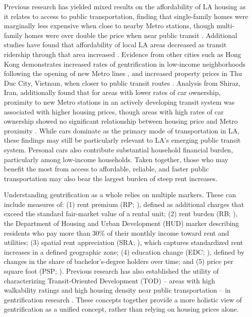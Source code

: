 \documentclass[11pt]{article}
\begin{document}
Previous research has yielded mixed results on the affordability of LA housing as it relates to access to public transportation, finding that single-family homes were marginally less expensive when close to nearby Metro stations, though multi-family homes were over double the price when near public transit \citep{zhong2016rail}. Additional studies have found that affordability of local LA areas decreased as transit ridership through that area increased \citep{lee2025ticket}. Evidence from other cities such as Hong Kong demonstrates increased rates of gentrification in low-income neighborhoods following the opening of new Metro lines \citep{leung2025impacts}, and increased property prices in Thu Duc City, Vietnam, when closer to public transit routes \citep{nguyen2026role}. Analysis from Shiraz, Iran, additionally found that for areas with lower rates of car ownership, proximity to new Metro stations in an actively developing transit system was associated with higher housing prices, though areas with high rates of car ownership showed no significant relationship between housing price and Metro proximity \citep{kashkooli2025impact}. While cars dominate as the primary mode of transportation in LA, these findings may still be particularly relevant to LA's emerging public transit system. Personal cars also contribute substantial household financial burden, particularly among low-income households. Taken together, those who may benefit the most from access to affordable, reliable, and faster public transportation may also bear the largest burden of steep rent increases.

Understanding gentrification as a whole relies on multiple markers. These can include measures of: (1) rent premium (RP; \citealp{zuk2018gentrification}), defined as additional charges that exceed the standard fair-market value of a rental unit; (2) rent burden (RB; \citealp{zuk2018gentrification}), the Department of Housing and Urban Development (HUD) marker describing residents who pay more than 30\% of their monthly income toward rent and utilities; (3) spatial rent appreciation (SRA; \citealp{atuesta2019housing}), which captures standardized rent increases in a defined geographic zone; (4) education change (EDC; \citealp{freeman2005displacement}), defined by changes in the share of bachelor's-degree holders over time; and (5) price per square foot (PSP; \citealp{chapplezuk_forewarned}). Previous research has also established the utility of characterizing Transit-Oriented Development (TOD) -- areas with high walkability ratings and high housing density near public transportation -- in gentrification research \citep{kahn2007gentrification, nilsson2018transit}. These concepts together provide a more holistic view of gentrification as a unified concept, rather than relying on housing prices alone.
\end{document}
